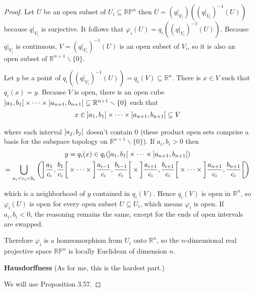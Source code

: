 \begin{proof}
	Let $U$ be an open subset of $U_{i} \subseteq \mathbb{RP}^{n}$ then $U = (q\vert_{V_{i}})({(q\vert_{V_{i}})}^{-1}(U))$ because $q\vert_{V_{i}}$ is surjective. It follows that $\varphi_{i}(U) = q_{i}({(q\vert_{V_{i}})}^{-1}(U))$. Because $q\vert_{V_{i}}$ is continuous, $V = {(q\vert_{V_{i}})}^{-1}(U)$ is an open subset of $V_{i}$, so it is also an open subset of $\mathbb{R}^{n+1}\smallsetminus\{ 0 \}$.

	Let $y$ be a point of $q_{i}({(q\vert_{V_{i}})}^{-1}(U)) = q_{i}(V) \subseteq \mathbb{R}^{n}$. There is $x\in V$ such that $q_{i}(x) = y$. Because $V$ is open, there is an open cube $\left]{a_{1}, b_{1}}\right[\times\cdots\times\left]{a_{n+1}, b_{n+1}}\right[ \subseteq \mathbb{R}^{n+1}\smallsetminus\{0\}$ such that
	\begin{align*}
		x \in \left]{a_{1}, b_{1}}\right[\times\cdots\times\left]{a_{n+1}, b_{n+1}}\right[ \subseteq V
	\end{align*}

	where each interval $\left]{a_{j}, b_{j}}\right[$ doesn't contain $0$ (these product open sets comprise a basis for the subspace topology on $\mathbb{R}^{n+1}\smallsetminus\{0\}$). If $a_{i}, b_{i} > 0$ then
	\begin{multline*}
		y = q_{i}(x) \in q_{i}(\left]{a_{1}, b_{1}}\right[\times\cdots\times\left]{a_{n+1}, b_{n+1}}\right[) \\
		= \bigcup_{a_{i} < c_{i} < b_{i}}\left(\left]{\frac{a_{1}}{c_{i}}, \frac{b_{1}}{c_{i}}}\right[ \times \cdots \times \left]{\frac{a_{i-1}}{c_{i}}, \frac{b_{i-1}}{c_{i}}}\right[ \times \left]{\frac{a_{i+1}}{c_{i}}, \frac{b_{i+1}}{c_{i}}}\right[ \times \cdots \times \left]{\frac{a_{n+1}}{c_{i}}, \frac{b_{n+1}}{c_{i}}}\right[\right)
	\end{multline*}

	which is a neighborhood of $y$ contained in $q_{i}(V)$. Hence $q_{i}(V)$ is open in $\mathbb{R}^{n}$, so $\varphi_{i}(U)$ is open for every open subset $U\subseteq U_{i}$, which means $\varphi_{i}$ is open. If $a_{i}, b_{i} < 0$, the reasoning remains the same, except for the ends of open intervals are swapped.

	Therefore $\varphi_{i}$ is a homeomorphism from $U_{i}$ onto $\mathbb{R}^{n}$, so the $n$-dimensional real projective space $\mathbb{RP}^{n}$ is locally Euclidean of dimension $n$.

	\textbf{Hausdorffness} (As for me, this is the hardest part.)

	We will use Proposition 3.57.


\end{proof}
